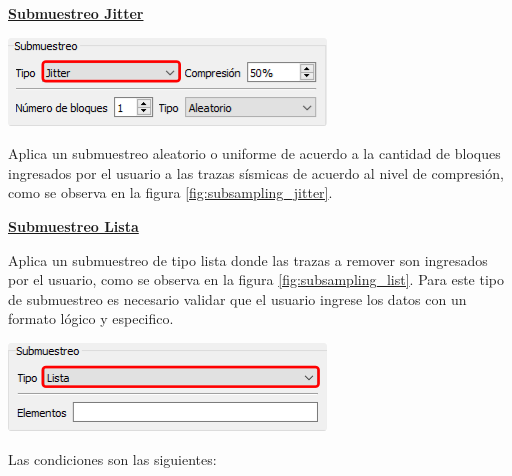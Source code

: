 \documentclass[12pt,twoside,letter]{ol-softwaremanual}
\newenvironment{Figure}
  {\par\medskip\noindent\minipage{\linewidth}}
  {\endminipage\par\medskip}
\begin{document}
\underline{\textbf{Submuestreo Jitter}}

\begin{multicols}{2}

\begin{Figure}
	\centering
	\includegraphics[width=0.8\linewidth]{subsampling-jitter.png}
	\label{fig:subsampling_jitter}
\end{Figure}

Aplica un submuestreo aleatorio o uniforme de acuerdo a la cantidad de bloques ingresados por el usuario a las trazas sísmicas de acuerdo al nivel de compresión, como se observa en la figura \ref{fig:subsampling_jitter}.

\end{multicols}

\underline{\textbf{Submuestreo Lista}}

\begin{multicols}{2}

Aplica un submuestreo de tipo lista donde las trazas a remover son ingresados por el usuario, como se observa en la figura \ref{fig:subsampling_list}. Para este tipo de submuestreo es necesario validar que el usuario ingrese los datos con un formato lógico y especifico.

\begin{Figure}
    \vspace{5mm}
    \centering
    \includegraphics[width=0.8\linewidth]{subsampling-list.png}
    \label{fig:subsampling_list}
\end{Figure}

\end{multicols}

Las condiciones son las siguientes:
\end{document}
